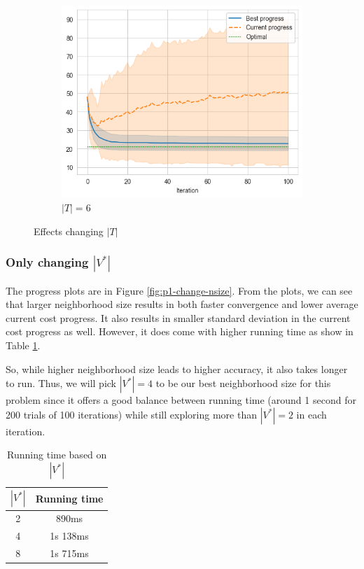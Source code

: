 \begin{figure}[ht]
    \begin{subfigure}{0.32\textwidth}
        \centering
        \includegraphics[width=\textwidth]{../images/p1/added64s.png}
        \caption{\(|T| = 6\)}
    \end{subfigure}
    \hfill

    \caption{Effects changing \(|T|\)}
    \label{fig:p1-change-tenure}
\end{figure}

\subsubsection{Only changing \(|V^*|\)}

The progress plots are in Figure \ref{fig:p1-change-nsize}. From the plots, we can see that larger neighborhood size results in both faster convergence and lower average current cost progress. It also results in smaller standard deviation in the current cost progress as well. However, it does come with higher running time as show in Table \ref{table:sample-time}.

So, while higher neighborhood size leads to higher accuracy, it also takes longer to run. Thus, we will pick \(|V^*|=4\) to be our best neighborhood size for this problem since it offers a good balance between running time (around 1 second for 200 trials of 100 iterations) while still exploring more than \(|V^*| = 2\) in each iteration.

\begin{table}[ht]
    \centering
    \begin{tabular}{c c}
        \toprule
        \(|V^*|\) & Running time \\
        \midrule
        2 & 890ms \\
        4 & 1s 138ms \\
        8 & 1s 715ms \\
        \bottomrule
    \end{tabular}
    \caption{Running time based on \(|V^*|\)}
    \label{table:sample-time}
\end{table}

